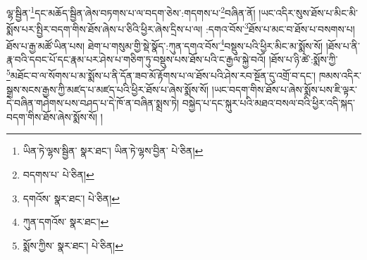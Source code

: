 ལྷ་སྦྱིན་\footnote{ཡིན་ཏེ་ལྷས་སྦྱིན་  སྣར་ཐང་། ཡིན་ཏེ་ལྷས་བྱིན་  པེ་ཅིན། }དང་མཆོད་སྦྱིན་ཞེས་བཏགས་པ་ལ་བདག་ཅེས་:གདགས་པ་\footnote{བདགས་པ་  པེ་ཅིན། }བཞིན་ནོ། །ཡང་འདིར་སུས་ཐོས་པ་མིང་མི་སྨོས་པར་སྤྱིར་བདག་གིས་ཐོས་ཞེས་པ་ཅིའི་ཕྱིར་ཞེས་དྲིས་པ་ལ། :དགའ་བོས་\footnote{དགའོས་  སྣར་ཐང་།  པེ་ཅིན། }ཐོས་པ་མང་བ་ཐོས་པ་བསགས་པ། ཐོས་པ་རྒྱ་མཚོ་ཡིན་པས། ཐེག་པ་གསུམ་གྱི་སྡེ་སྣོད་:ཀུན་དགའ་བོས་\footnote{ཀུན་དགའོས་  སྣར་ཐང་། }བསྡུས་པའི་ཕྱིར་མིང་མ་སྨོས་སོ། །ཐོས་པ་ནི་རྣ་བའི་དབང་པོ་དང་རྣམ་པར་ཤེས་པ་གཅིག་ཏུ་བསྡུས་པས་ཐོས་པའི་ང་རྒྱལ་སྐྱེ་བའོ། །ཐོས་པ་ཉི་ཚེ་:སྨོས་ཀྱི་\footnote{སྨོས་ཀྱིས་  སྣར་ཐང་།  པེ་ཅིན། }མཐོང་བ་ལ་སོགས་པ་མ་སྨོས་པ་ནི་དོན་ཟབ་མོ་རྟོགས་པ་ལ་ཐོས་པའི་ཤེས་རབ་སྔོན་དུ་འགྲོ་བ་དང་། ཁམས་འདིར་སྒྲས་སངས་རྒྱས་ཀྱི་མཛད་པ་མཛད་པའི་ཕྱིར་ཐོས་པ་ཞེས་སྨོས་སོ། །ཡང་བདག་གིས་ཐོས་པ་ཞེས་སྨོས་པས་ཇི་ལྟར་དེ་བཞིན་གཤེགས་པས་བཤད་པ་དེ་ཁོ་ན་བཞིན་སྨྲས་ཏེ། བསྐྱེད་པ་དང་སྐུར་པའི་མཐའ་བསལ་བའི་ཕྱིར་འདི་སྐད་བདག་གིས་ཐོས་ཞེས་སྨོས་སོ། །
